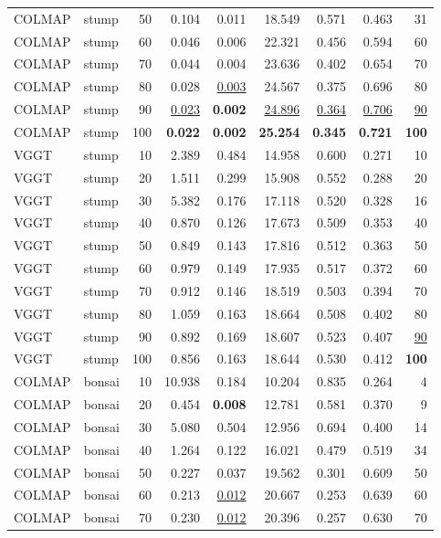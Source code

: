\begin{table}[H]
\begin{tabular}{llrrrrrrr}
COLMAP & stump & 50 & 0.104 & 0.011 & 18.549 & 0.571 & 0.463 & 31 \\
COLMAP & stump & 60 & 0.046 & 0.006 & 22.321 & 0.456 & 0.594 & 60 \\
COLMAP & stump & 70 & 0.044 & 0.004 & 23.636 & 0.402 & 0.654 & 70 \\
COLMAP & stump & 80 & 0.028 & \underline{0.003} & 24.567 & 0.375 & 0.696 & 80 \\
COLMAP & stump & 90 & \underline{0.023} & \textbf{0.002} & \underline{24.896} & \underline{0.364} & \underline{0.706} & \underline{90} \\
COLMAP & stump & 100 & \textbf{0.022} & \textbf{0.002} & \textbf{25.254} & \textbf{0.345} & \textbf{0.721} & \textbf{100} \\
VGGT & stump & 10 & 2.389 & 0.484 & 14.958 & 0.600 & 0.271 & 10 \\
VGGT & stump & 20 & 1.511 & 0.299 & 15.908 & 0.552 & 0.288 & 20 \\
VGGT & stump & 30 & 5.382 & 0.176 & 17.118 & 0.520 & 0.328 & 16 \\
VGGT & stump & 40 & 0.870 & 0.126 & 17.673 & 0.509 & 0.353 & 40 \\
VGGT & stump & 50 & 0.849 & 0.143 & 17.816 & 0.512 & 0.363 & 50 \\
VGGT & stump & 60 & 0.979 & 0.149 & 17.935 & 0.517 & 0.372 & 60 \\
VGGT & stump & 70 & 0.912 & 0.146 & 18.519 & 0.503 & 0.394 & 70 \\
VGGT & stump & 80 & 1.059 & 0.163 & 18.664 & 0.508 & 0.402 & 80 \\
VGGT & stump & 90 & 0.892 & 0.169 & 18.607 & 0.523 & 0.407 & \underline{90} \\
VGGT & stump & 100 & 0.856 & 0.163 & 18.644 & 0.530 & 0.412 & \textbf{100} \\
\midrule
COLMAP & bonsai & 10 & 10.938 & 0.184 & 10.204 & 0.835 & 0.264 & 4 \\
COLMAP & bonsai & 20 & 0.454 & \textbf{0.008} & 12.781 & 0.581 & 0.370 & 9 \\
COLMAP & bonsai & 30 & 5.080 & 0.504 & 12.956 & 0.694 & 0.400 & 14 \\
COLMAP & bonsai & 40 & 1.264 & 0.122 & 16.021 & 0.479 & 0.519 & 34 \\
COLMAP & bonsai & 50 & 0.227 & 0.037 & 19.562 & 0.301 & 0.609 & 50 \\
COLMAP & bonsai & 60 & 0.213 & \underline{0.012} & 20.667 & 0.253 & 0.639 & 60 \\
COLMAP & bonsai & 70 & 0.230 & \underline{0.012} & 20.396 & 0.257 & 0.630 & 70 \\

\end{tabular}
\end{table}
